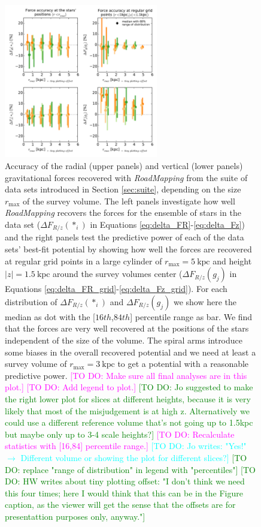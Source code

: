 \documentclass[iop,revtex4,numberedappendix,appendixfloats]{emulateapj}
\newcommand{\RM}{{\sl RoadMapping}}
\newcommand{\Wilma}[1]{\textcolor{Magenta}{#1}}
\newcommand{\HW}[1]{\textcolor{Green}{#1}}
\newcommand{\Jo}[1]{\textcolor{Cyan}{#1}}
\begin{document}
\begin{figure}[!htbp]
\centering
\includegraphics[width=0.6\textwidth]{fig/MNdHHdiffSph2_bias_in_forces_recovery_2.pdf}
\caption{Accuracy of the radial (upper panels) and vertical (lower panels) gravitational forces recovered with \RM{} from the suite of data sets introduced in Section \ref{sec:suite}, depending on the size $r_\text{max}$ of the survey volume. The left panels investigate how well \RM{} recovers the forces for the ensemble of stars in the data set ($\Delta F_{R/z}(*_i)$ in Equations \eqref{eq:delta_FR}-\eqref{eq:delta_Fz}) and the right panels test the predictive power of each of the data sets' best-fit potential by showing how well the forces are recovered at regular grid points in a large cylinder of $r_\text{max}=5~\text{kpc}$ and height $|z|=1.5~\text{kpc}$ around the survey volumes center ($\Delta F_{R/z}(g_j)$ in Equations \eqref{eq:delta_FR_grid}-\eqref{eq:delta_Fz_grid}). For each distribution of $\Delta F_{R/z}(*_i)$ and $\Delta F_{R/z}(g_j)$ we show here the median as dot with the  [$16th$,$84th$] percentile range as bar. We find that the forces are very well recovered at the positions of the stars independent of the size of the volume. The spiral arms introduce some biases in the overall recovered potential and we need at least a survey volume of $r_\text{max}=3~\text{kpc}$ to get a potential with a reasonable predictive power. \Wilma{[TO DO: Make sure all final analyses are in this plot.]} \Wilma{[TO DO: Add legend to plot.]} \HW{[TO DO: Jo suggested to make the right lower plot for slices at different heights, because it is very likely that most of the misjudgement is at high z. Alternatively we could use a different reference volume that's not going up to 1.5kpc but maybe only up to 3-4 scale heights?]} \Wilma{[TO DO: Recalculate statistics with [16,84] percentile range.]} \Jo{[TO DO: Jo writes: "Yes!" $\longrightarrow$ Different volume or showing the plot for different slices?]} \HW{[TO DO: replace "range of distribution" in legend with "percentiles"]} \HW{[TO DO: HW writes about tiny plotting offset: "I don't think we need this four times; here I would think that this can be in the Figure caption, as the viewer will get the sense that the offsets are for presentattion purposes only, anyway."]}}
\label{fig:forces_bias}
\end{figure}
\end{document}
